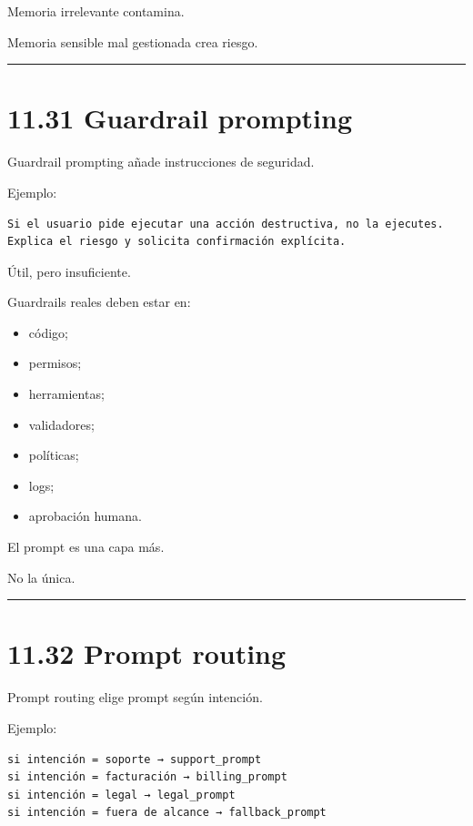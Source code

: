 Memoria irrelevante contamina.

Memoria sensible mal gestionada crea riesgo.

\begin{center}\rule{0.5\linewidth}{0.5pt}\end{center}

\section{11.31 Guardrail prompting}\label{guardrail-prompting}

Guardrail prompting añade instrucciones de seguridad.

Ejemplo:

\begin{lstlisting}
Si el usuario pide ejecutar una acción destructiva, no la ejecutes.
Explica el riesgo y solicita confirmación explícita.
\end{lstlisting}

Útil, pero insuficiente.

Guardrails reales deben estar en:

\begin{itemize}
\tightlist
\item
  código;
\item
  permisos;
\item
  herramientas;
\item
  validadores;
\item
  políticas;
\item
  logs;
\item
  aprobación humana.
\end{itemize}

El prompt es una capa más.

No la única.

\begin{center}\rule{0.5\linewidth}{0.5pt}\end{center}

\section{11.32 Prompt routing}\label{prompt-routing}

Prompt routing elige prompt según intención.

Ejemplo:

\begin{lstlisting}
si intención = soporte → support_prompt
si intención = facturación → billing_prompt
si intención = legal → legal_prompt
si intención = fuera de alcance → fallback_prompt
\end{lstlisting}

